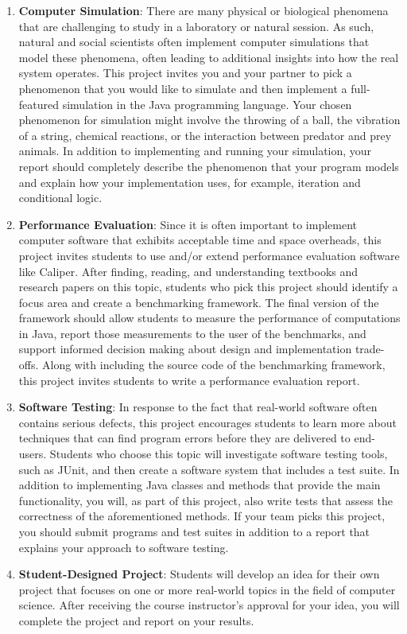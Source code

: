 \documentclass[11pt]{article}
\begin{document}
\begin{enumerate}
  \item {\bf Computer Simulation}: There are many physical or biological phenomena that are challenging to study in a
    laboratory or natural session. As such, natural and social scientists often implement computer simulations that
    model these phenomena, often leading to additional insights into how the real system operates. This project invites
    you and your partner to pick a phenomenon that you would like to simulate and then implement a full-featured
    simulation in the Java programming language. Your chosen phenomenon for simulation might involve the throwing of a
    ball, the vibration of a string, chemical reactions, or the interaction between predator and prey animals. In
    addition to implementing and running your simulation, your report should completely describe the phenomenon that
    your program models and explain how your implementation uses, for example, iteration and conditional logic.

  \item {\bf Performance Evaluation}: Since it is often important to implement computer software that exhibits
    acceptable time and space overheads, this project invites students to use and/or extend performance evaluation
    software like Caliper. After finding, reading, and understanding textbooks and research papers on this topic,
    students who pick this project should identify a focus area and create a benchmarking framework. The
    final version of the framework should allow students to measure the performance of computations in Java, report
    those measurements to the user of the benchmarks, and support informed decision making about design and
    implementation trade-offs. Along with including the source code of the benchmarking framework, this
    project invites students to write a performance evaluation report.

  \item {\bf Software Testing}: In response to the fact that real-world software often contains serious defects, this
    project encourages students to learn more about techniques that can find program errors before they are delivered to
    end-users. Students who choose this topic will investigate software testing tools, such as JUnit, and then create
    a software system that includes a test suite. In addition to implementing Java classes and methods that provide the
    main functionality, you will, as part of this project, also write tests that assess the correctness of the
    aforementioned methods. If your team picks this project, you should submit programs and test suites in
    addition to a report that explains your approach to software testing.

  \item {\bf Student-Designed Project}: Students will develop an idea for their own project that focuses on one or more
    real-world topics in the field of computer science. After receiving the course instructor's approval for your idea,
    you will complete the project and report on your results.

\end{enumerate}
\end{document}
